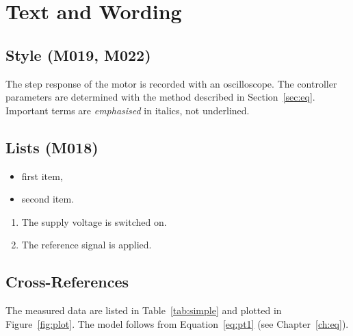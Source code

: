 \documentclass[state=Report]{mcidoc}
\newcounter{romanpage}
\begin{document}
\tableofcontents
\clearpage
\setcounter{romanpage}{\value{page}}

\chapter{Text and Wording}

\section{Style (M019, M022)}
The step response of the motor is recorded with an oscilloscope. The
controller parameters are determined with the method described in
Section~\ref{sec:eq}. Important terms are \emph{emphasised} in italics, not
underlined.

\section{Lists (M018)}
\begin{itemize}
  \item first item,
  \item second item.
\end{itemize}
\begin{enumerate}
  \item The supply voltage is switched on.
  \item The reference signal is applied.
\end{enumerate}

\section{Cross-References}
The measured data are listed in Table~\ref{tab:simple} and plotted in
Figure~\ref{fig:plot}. The model follows from Equation~\eqref{eq:pt1}
(see Chapter~\ref{ch:eq}).

\end{document}
